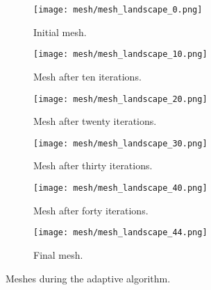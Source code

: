 \begin{figure}[htbp]
    \begin{subfigure}[t]{0.49\textwidth}
        \centering
        \texttt{[image: mesh/mesh\_landscape\_0.png]}
        \caption{Initial mesh.}
        \label{fig:mesh_0}
    \end{subfigure}
    \begin{subfigure}[t]{0.49\textwidth}
        \centering
        \texttt{[image: mesh/mesh\_landscape\_10.png]}
        \caption{Mesh after ten iterations.}
        \label{fig:mesh_10}
    \end{subfigure}
    \vspace{1cm}
    \begin{subfigure}[t]{0.49\textwidth}
        \centering
        \texttt{[image: mesh/mesh\_landscape\_20.png]}
        \caption{Mesh after twenty iterations.}
        \label{fig:mesh_20}
    \end{subfigure}
    \begin{subfigure}[t]{0.49\textwidth}
        \centering
        \texttt{[image: mesh/mesh\_landscape\_30.png]}
        \caption{Mesh after thirty iterations.}
        \label{fig:mesh_30}
    \end{subfigure}
    \vspace{1cm}
    \begin{subfigure}[t]{0.49\textwidth}
        \centering
        \texttt{[image: mesh/mesh\_landscape\_40.png]}
        \caption{Mesh after forty iterations.}
        \label{fig:mesh_40}
    \end{subfigure}
    \begin{subfigure}[t]{0.49\textwidth}
        \centering
        \texttt{[image: mesh/mesh\_landscape\_44.png]}
        \caption{Final mesh.}
        \label{fig:mesh_50}
    \end{subfigure}
    \caption{Meshes during the adaptive algorithm.}
\end{figure}


